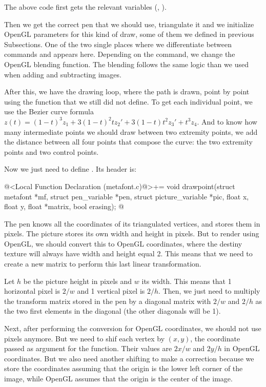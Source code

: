 {{{{{The above code first gets the relevant variables
(, ).

Then we get the correct pen that we should use,
triangulate it and we initialize OpenGL parameters for this kind of
draw, some of them we defined in previous Subsections. One of the two
single places where we differentiate between
commands  and  appears
here. Depending on the command, we change the OpenGL blending
function. The blending follows the same logic than we used when adding
and subtracting images.

After this, we have the drawing loop, where the path is drawn, point
by point using the function  that we still did
not define. To get each individual point, we use the Bezier curve
formula $z(t) = (1-t)^3z_1 + 3(1-t)^2tz_2' +
3(1-t)t^2z_3'+t^3z_4$. And to know how many intermediate points we
should draw between two extremity points, we add the distance between
all four points that compose the curve: the two extremity points and
two control points.

Now we just need to define . Its header is:

\iniciocodigo
@<Local Function Declaration (metafont.c)@>+=
void drawpoint(struct metafont *mf, struct pen_variable *pen,
               struct picture_variable *pic, float x, float y, float *matrix,
               bool erasing);
@
\fimcodigo

The pen knows all the coordinates of its triangulated vertices, and
stores them in pixels. The picture stores its own width and height in
pixels. But to render using OpenGL, we should convert this to OpenGL
coordinates, where the destiny texture will always have width and
height equal 2. This means that we need to create a new matrix to
perform this last linear transformation.

Let $h$ be the picture height in pixels and $w$ its width. This means
that 1 horizontal pixel is $2/w$ and 1 vertical pixel is $2/h$. Then,
we just need to multiply the transform matrix stored in the pen by a
diagonal matrix with $2/w$ and $2/h$ as the two first elements in the
diagonal (the other diagonals will be 1).

Next, after performing the conversion for OpenGL coordinates, we
should not use pixels anymore. But we need to shif each vertex by $(x,
y)$, the coordinate passed as argument for the 
function. Their values are $2x/w$ and $2y/h$ in OpenGL
coordinates. But we also need another shifting to make a correction
because we store the coordinates assuming that the origin is the lower
left corner of the image, while OpenGL assumes that the origin is the
center of the image.

}}}}}
